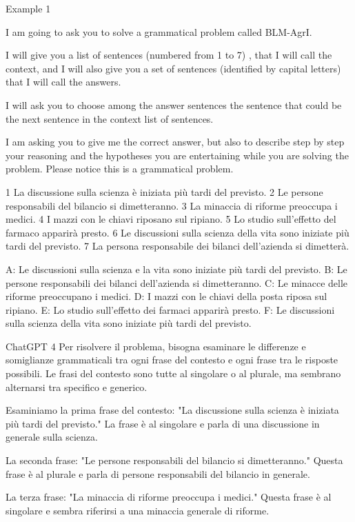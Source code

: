 Example 1

I am going to ask you to solve a grammatical problem called BLM-AgrI.  

I will give you a list of sentences (numbered from 1 to 7) , that I will call the context, and I will also give you a set of sentences (identified by capital letters) that I will call  the answers. 

I will ask you to choose among the answer sentences the sentence that could be the next sentence in the context list of sentences.

I am asking you to give me the correct answer, but also to describe step by step  your reasoning and the hypotheses you are entertaining while you are solving the problem. Please notice this is a grammatical problem.


1 La discussione sulla scienza è iniziata più tardi del previsto.
2 Le persone responsabili del bilancio si dimetteranno.
3 La minaccia di riforme preoccupa i medici.
4 I mazzi con le chiavi riposano sul ripiano.
5 Lo studio sull'effetto del farmaco apparirà presto.
6 Le discussioni sulla scienza della vita sono iniziate più tardi del previsto.
7 La persona responsabile dei bilanci dell'azienda si dimetterà.

A: Le discussioni sulla scienza e la vita sono iniziate più tardi del previsto.
B: Le persone responsabili dei bilanci dell'azienda si dimetteranno.
C: Le minacce delle riforme preoccupano i medici.
D: I mazzi con le chiavi della posta riposa sul ripiano.
E: Lo studio sull'effetto dei farmaci apparirà presto.
F: Le discussioni sulla scienza della vita sono iniziate più tardi del previsto.

ChatGPT 4
Per risolvere il problema, bisogna esaminare le differenze e somiglianze grammaticali tra ogni frase del contesto e ogni frase tra le risposte possibili. Le frasi del contesto sono tutte al singolare o al plurale, ma sembrano alternarsi tra specifico e generico.

Esaminiamo la prima frase del contesto:
"La discussione sulla scienza è iniziata più tardi del previsto."
La frase è al singolare e parla di una discussione in generale sulla scienza.

La seconda frase:
"Le persone responsabili del bilancio si dimetteranno."
Questa frase è al plurale e parla di persone responsabili del bilancio in generale.

La terza frase:
"La minaccia di riforme preoccupa i medici."
Questa frase è al singolare e sembra riferirsi a una minaccia generale di riforme.

